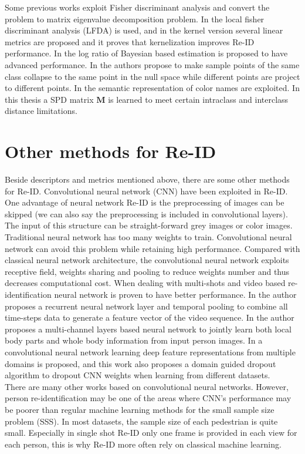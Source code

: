 Some previous works exploit Fisher discriminant analysis and convert the problem to matrix eigenvalue decomposition problem. In \cite{LFDA} the local fisher discriminant analysis (LFDA) is used, and in \cite{KernelVersionMetrics} the kernel version several linear metrics are proposed and it proves that kernelization improves Re-ID performance. In \cite{LOMO} the log ratio of Bayesian based estimation is proposed to have advanced performance. In \cite{NFST} the authors propose to make sample points of the same class collapse to the same point in the null space while different points are project to different points. In \cite{SCNCD} the semantic representation of color names are exploited. In this thesis a SPD matrix $\bm{M}$ is learned to meet certain intraclass and interclass distance limitations. 

\section{Other methods for Re-ID}
Beside descriptors and metrics mentioned above, there are some other methods for Re-ID. Convolutional neural network (CNN) have been exploited in Re-ID. One advantage of neural network Re-ID is the preprocessing of images can be skipped (we can also say the preprocessing is included in convolutional layers). The input of this structure can be straight-forward grey images or color images.  Traditional neural network has too many weights to train. Convolutional neural network can avoid this problem while retaining high performance. Compared with classical neural network architecture, the convolutional neural network exploits receptive field, weights sharing and pooling to reduce weights number and thus decreases computational cost. When dealing with multi-shots and video based re-identification neural network is proven to have better performance. In \cite{RecurrentCNN} the author proposes a recurrent neural network layer and temporal pooling to combine all time-steps data to generate a feature vector of the video sequence. In \cite{MultiCNN} the author proposes a multi-channel layers based neural network to jointly learn both local body parts and whole body information from input person images.  In \cite{DeepfeatureCNN} a convolutional neural network learning deep feature representations from multiple domains is proposed, and this work also proposes a domain guided dropout algorithm to dropout CNN weights when learning from different datasets. \\
\indent There are many other works based on convolutional neural networks. However, person re-identification may be one of the areas where CNN's performance may be poorer than regular machine learning methods for the small sample size problem (SSS). In most datasets, the sample size of each pedestrian is quite small. Especially in single shot Re-ID only one frame is provided in each view for each person, this is why Re-ID more often rely on classical machine learning.

